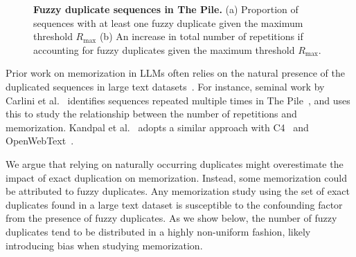 \begin{figure}[ht]
\centering
{}
\caption{\textbf{Fuzzy duplicate sequences in The Pile.} (a) Proportion of sequences with at least one fuzzy duplicate given the maximum threshold $R_\text{max}$ (b) An increase in total number of repetitions if accounting for fuzzy duplicates given the maximum threshold $R_\text{max}$.}
\label{fig:near_dups}
\end{figure}


Prior work on memorization in LLMs often relies on the natural presence of the duplicated sequences in large text datasets~\cite{carlini2021extracting,carlini2022quantifying,kandpal2022deduplicating, ippolito2022preventing}. For instance, seminal work by Carlini et al.~\cite{carlini2022quantifying} identifies sequences repeated multiple times in The Pile~\cite{pile}, and uses this to study the relationship between the number of repetitions and memorization. Kandpal et al.~\cite{kandpal2022deduplicating} adopts a similar approach with C4~\cite{2019t5} and OpenWebText~\cite{Gokaslan2019OpenWeb}.

We argue that relying on naturally occurring duplicates might overestimate the impact of exact duplication on memorization. Instead, some memorization could be attributed to fuzzy duplicates. Any memorization study using the set of exact duplicates found in a large text dataset is susceptible to the confounding factor from the presence of fuzzy duplicates. As we show below, the number of fuzzy duplicates tend to be distributed in a highly non-uniform fashion, likely introducing bias when studying memorization.

